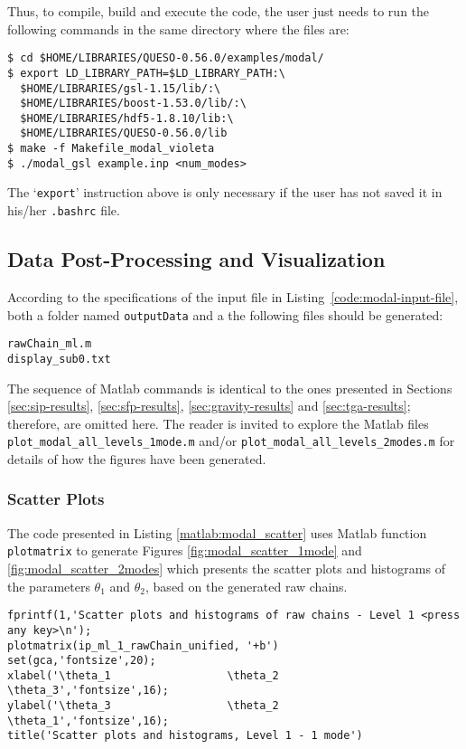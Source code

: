 Thus, to compile, build and execute the code, the user just needs to run the following commands in the same directory where the files are:
\begin{lstlisting}
$ cd $HOME/LIBRARIES/QUESO-0.56.0/examples/modal/
$ export LD_LIBRARY_PATH=$LD_LIBRARY_PATH:\
  $HOME/LIBRARIES/gsl-1.15/lib/:\
  $HOME/LIBRARIES/boost-1.53.0/lib/:\
  $HOME/LIBRARIES/hdf5-1.8.10/lib:\
  $HOME/LIBRARIES/QUESO-0.56.0/lib 
$ make -f Makefile_modal_violeta 
$ ./modal_gsl example.inp <num_modes>
\end{lstlisting}

The `\verb+export+' instruction above is only necessary if the user has not saved it in his/her \verb+.bashrc+ file. 


\subsection{Data Post-Processing and Visualization}\label{sec:modal-results}



According to the specifications of the input file in Listing~\ref{code:modal-input-file}, both a folder named \verb+outputData+ and a the following files should be generated:
\begin{verbatim}
rawChain_ml.m 
display_sub0.txt    
\end{verbatim}


The sequence of Matlab commands is identical to the ones presented in Sections
\ref{sec:sip-results}, \ref{sec:sfp-results}, \ref{sec:gravity-results} and \ref{sec:tga-results};
therefore, are omitted here. The reader is invited to explore the Matlab files
\texttt{plot\_modal\_all\_levels\_1mode.m}  and/or \texttt{plot\_modal\_all\_levels\_2modes.m}  
for details of how the figures have been generated.


\subsubsection{Scatter Plots}

The code presented in Listing \ref{matlab:modal_scatter} uses Matlab function \verb+plotmatrix+ to generate Figures \ref{fig:modal_scatter_1mode} and \ref{fig:modal_scatter_2modes}
which presents the scatter plots and histograms of the parameters $\theta_1$ and $\theta_2$, based on the generated raw chains. 


\begin{lstlisting}[label=matlab:modal_scatter,caption={Matlab code for the scatter plots depicted in Figures \ref{fig:modal_scatter_1mode} and \ref{fig:modal_scatter_2modes}.}]
fprintf(1,'Scatter plots and histograms of raw chains - Level 1 <press any key>\n');
plotmatrix(ip_ml_1_rawChain_unified, '+b')
set(gca,'fontsize',20); 
xlabel('\theta_1                  \theta_2                   \theta_3','fontsize',16);
ylabel('\theta_3                  \theta_2                   \theta_1','fontsize',16);
title('Scatter plots and histograms, Level 1 - 1 mode')
\end{lstlisting}

